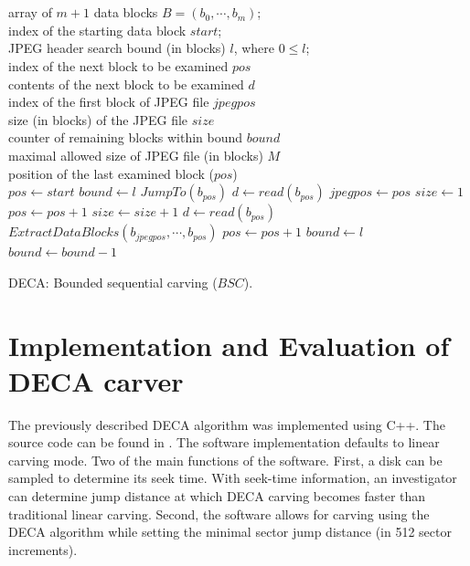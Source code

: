 \documentclass[final,5p,times,twocolumn,authoryear]{elsarticle}
\begin{document}
\begin{algorithm}[ht]
\begin{algorithmic}
    \\
    \INPUT
    \\ {array of $m+1$ data blocks $B = \left(b_0,\cdots,b_m\right)$;}
    \\ {index of the starting data block $start$;}
    \\ {JPEG header search bound (in blocks) $l$, where $0 \le l$;}
    \VARIABLES
    \\ {index of the next block to be examined $pos$}
    \\ {contents of the next block to be examined $d$}
    \\ {index of the first block of JPEG file $jpegpos$}
    \\ {size (in blocks) of the JPEG file $size$}
    \\ {counter of remaining blocks within bound $bound$}
    \CONSTANTS
    \\ {maximal allowed size of JPEG file (in blocks) $M$}
    \RETURNS
    \\ {position of the last examined block ($pos$)}
    \\
    \State $pos \gets start$
    \State $bound \gets l$
    \State $JumpTo(b_{pos})$ 
       \State $d \gets read(b_{pos})$
 	      \State $jpegpos \gets pos$
    	  \State $size \gets 1$
    	     \State $pos \gets pos+1$
    	     \State $size \gets size+1$
    	  	 \State $d \gets read(b_{pos})$
    	  \EndWhile
    	  \State $ExtractDataBlocks(b_{jpegpos},\cdots,b_{pos})$
    	  \State $pos \gets pos+1$
    	  \State $bound \gets l$  
       \Else
         \State $bound \gets bound-1$
       \EndIf
    \EndWhile
	\\
    
\end{algorithmic}
\caption{DECA: Bounded sequential carving ($BSC$).}
\label{alg:deca-bsc}
\end{algorithm}

\section{Implementation and Evaluation of DECA carver} \label{sec:implement}
The previously described DECA algorithm was implemented using C++. The source code can be found in \citep{gladyshevjames2015}. The software implementation defaults to linear carving mode. Two of the main functions of the software. First, a disk can be sampled to determine its seek time. With seek-time information, an investigator can determine jump distance at which DECA carving becomes faster than traditional linear carving. Second, the software allows for carving using the DECA algorithm while setting the minimal sector jump distance (in 512 sector increments).
\end{document}
